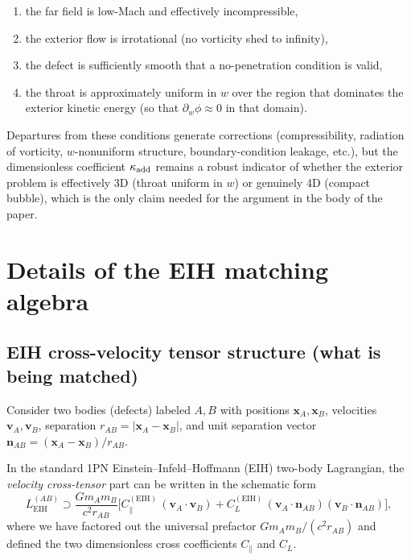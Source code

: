 \documentclass[11pt]{article}
\begin{document}
\begin{enumerate}
\item the far field is low-Mach and effectively incompressible,
\item the exterior flow is irrotational (no vorticity shed to infinity),
\item the defect is sufficiently smooth that a no-penetration condition is valid,
\item the throat is approximately uniform in $w$ over the region that dominates the
      exterior kinetic energy (so that $\partial_w\phi\approx 0$ in that domain).
\end{enumerate}

Departures from these conditions generate corrections (compressibility, radiation
of vorticity, $w$-nonuniform structure, boundary-condition leakage, etc.), but the
dimensionless coefficient $\kappa_{\rm add}$ remains a robust indicator of whether
the exterior problem is effectively 3D (throat uniform in $w$) or genuinely 4D
(compact bubble), which is the only claim needed for the argument in the body of
the paper.

\section{Details of the EIH matching algebra}
\label{app:eih-matching-algebra}

\subsection{EIH cross-velocity tensor structure (what is being matched)}
Consider two bodies (defects) labeled \(A,B\) with positions \(\mathbf{x}_A,\mathbf{x}_B\),
velocities \(\mathbf{v}_A,\mathbf{v}_B\), separation
\(
r_{AB}=|\mathbf{x}_A-\mathbf{x}_B|
\),
and unit separation vector
\(
\mathbf{n}_{AB}=(\mathbf{x}_A-\mathbf{x}_B)/r_{AB}.
\)

In the standard 1PN Einstein--Infeld--Hoffmann (EIH) two-body Lagrangian,
the \emph{velocity cross-tensor} part can be written in the schematic form
\begin{equation}
L_{\mathrm{EIH}}^{(AB)} \supset
\frac{G m_A m_B}{c^2 r_{AB}}
\Big[
C_\parallel^{\mathrm{(EIH)}}\,(\mathbf{v}_A\!\cdot\!\mathbf{v}_B)
+
C_L^{\mathrm{(EIH)}}\,(\mathbf{v}_A\!\cdot\!\mathbf{n}_{AB})(\mathbf{v}_B\!\cdot\!\mathbf{n}_{AB})
\Big],
\label{eq:eih-cross-template}
\end{equation}
where we have factored out the universal prefactor \(G m_A m_B/(c^2 r_{AB})\)
and defined the two dimensionless cross coefficients \(C_\parallel\) and \(C_L\).
\end{document}
